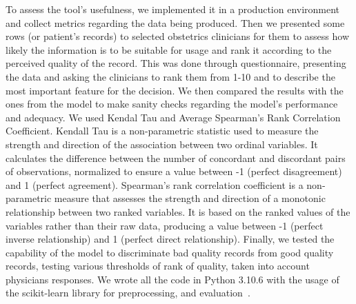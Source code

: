 To assess the tool's usefulness, we implemented it in a production environment and collect metrics regarding the data being produced. Then we presented some rows (or patient's records) to selected obstetrics clinicians for them to assess how likely the information is to be suitable for usage and rank it according to the perceived quality of the record. This was done through questionnaire, presenting the data and asking the clinicians to rank them from 1-10 and to describe the most important feature for the decision. We then compared the results with the ones from the model to make sanity checks regarding the model's performance and adequacy. We used Kendal Tau and Average Spearman's Rank Correlation Coefficient. Kendall Tau is a non-parametric statistic used to measure the strength and direction of the association between two ordinal variables. It calculates the difference between the number of concordant and discordant pairs of observations, normalized to ensure a value between -1 (perfect disagreement) and 1 (perfect agreement). Spearman's rank correlation coefficient is a non-parametric measure that assesses the strength and direction of a monotonic relationship between two ranked variables. It is based on the ranked values of the variables rather than their raw data, producing a value between -1 (perfect inverse relationship) and 1 (perfect direct relationship). Finally, we tested the capability of the model to discriminate bad quality records from good quality records, testing various thresholds of rank of quality, taken into account physicians responses.
We wrote all the code in Python 3.10.6 with the usage of the scikit-learn library for preprocessing, and evaluation\unskip~\cite{scikit-learn}.
